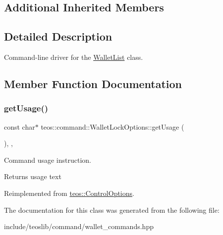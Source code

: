 \subsection*{Additional Inherited Members}


\subsection{Detailed Description}
Command-\/line driver for the \mbox{\hyperlink{classteos_1_1command_1_1_wallet_list}{Wallet\+List}} class. 

\subsection{Member Function Documentation}
\mbox{\label{classteos_1_1command_1_1_wallet_lock_options_aa0b3fd6dc244e1f32955c7a134b4fd85}} 
\subsubsection{\texorpdfstring{get\+Usage()}{getUsage()}}
{\footnotesize\ttfamily const char$\ast$ teos\+::command\+::\+Wallet\+Lock\+Options\+::get\+Usage (\begin{DoxyParamCaption}{ }\end{DoxyParamCaption})\hspace{0.3cm}{\ttfamily [inline]}, {\ttfamily [protected]}, {\ttfamily [virtual]}}



Command \textquotesingle{}usage\textquotesingle{} instruction. 

\begin{DoxyReturn}{Returns}
usage text 
\end{DoxyReturn}


Reimplemented from \mbox{\hyperlink{classteos_1_1_control_options_a0aa5671f9bc750ed5280c26c543874f3}{teos\+::\+Control\+Options}}.



The documentation for this class was generated from the following file\+:\begin{DoxyCompactItemize}
\item 
include/teoslib/command/wallet\+\_\+commands.\+hpp\end{DoxyCompactItemize}
